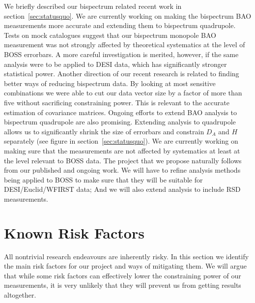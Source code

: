 We briefly described our bispectrum related recent work in
section~\ref{sec:statusquo}.  We are currently working on making the bispectrum
BAO measurements more accurate and extending them to bispectrum quadrupole.
Tests on mock catalogues suggest that our bispectrum monopole BAO measurement
was not strongly affected by theoretical systematics at the level of BOSS
errorbars. A more careful investigation is merited, however, if the same
analysis were to be applied to DESI data, which has significantly stronger
statistical power.  Another direction of our recent research is related to
finding better ways of reducing bispectrum data. By looking at most sensitive
combinations we were able to cut our data vector size by a factor of more than
five without sacrificing constraining power. This is relevant to the accurate
estimation of covariance matrices. Ongoing efforts to extend BAO analysis to
bispectrum quadrupole are also promising. Extending analysis to quadrupole
allows us to significantly shrink the size of errorbars and constrain $D_A$ and
$H$ separately (see figure in section~\ref{sec:statusquo}). We are currently
working on making sure that the measurements are not affected by systematics at
least at the level relevant to BOSS data. The project that we propose naturally
follows from our published and ongoing work. We will have to refine analysis
methods being applied to BOSS to make sure that they will be suitable for
DESI/Euclid/WFIRST data; And we will also extend analysis to include RSD
measurements.


\section{Known Risk Factors}

All nontrivial research endeavours are inherently risky. In this section we
identify the main risk factors for our project and ways of mitigating them. We
will argue that while some risk factors can effectively lower the constraining
power of our measurements, it is very unlikely that they will prevent us from
getting results altogether.


